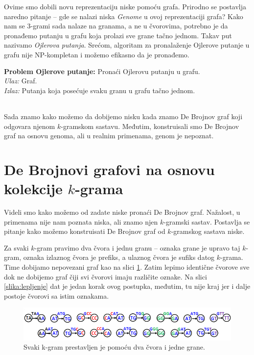 Ovime smo dobili novu reprezentaciju niske pomoću grafa. Prirodno se postavlja naredno pitanje -- gde se nalazi niska \textit{Genome} u ovoj reprezentaciji grafa? Kako nam se 3-grami sada nalaze na granama, a ne u čvorovima, potrebno je da pronađemo putanju u grafu koja prolazi sve grane tačno jednom. Takav put nazivamo \emph{Ojlerova putanja}. Srećom, algoritam za pronalaženje Ojlerove putanje u grafu nije NP-kompletan i možemo efikasno da je pronađemo.
~ \\
\begin{tcolorbox}
	\textbf{Problem Ojlerove putanje:} Pronaći Ojlerovu putanju u grafu. \\
	\textit{Ulaz:} Graf.\\
	\textit{Izlaz:} Putanja koja posećuje svaku granu u grafu tačno jednom.
\end{tcolorbox}

~\\

Sada znamo kako možemo da dobijemo nisku kada znamo De Brojnov graf koji odgovara njenom $k$-gramskom sastavu. Međutim, konstruisali smo De Brojnov graf na osnovu genoma, ali u realnim primenama, genom je nepoznat.

\section{De Brojnovi grafovi na osnovu kolekcije $k$-grama}

Videli smo kako mo\v zemo od zadate niske prona\'ci De Brojnov graf. Na\v zalost, u primenama nije nam poznata niska, ali znamo njen $k$-gramski sastav. Postavlja se pitanje kako mo\v zemo konstruisati De Brojnov graf od $k$-gramskog sastava niske. 

Za svaki $k$-gram pravimo dva čvora i jednu granu -- oznaka grane je upravo taj $k$-gram, oznaka izlaznog \v cvora je prefiks, a ulaznog \v cvora je sufiks datog $k$-grama. Time dobijamo nepovezani graf kao na slici \ref{slika:kgrami}. Zatim lepimo identične čvorove sve dok ne dobijemo graf čiji svi čvorovi imaju različite oznake. Na slici \ref{slika:lepljenje} dat je jedan korak ovog postupka, međutim, tu nije kraj jer i dalje postoje čvorovi sa istim oznakama.

\begin{figure}[h]
	\centering
	\includegraphics[width=1\textwidth]{poglavlja/3/slike/debrojnov1.png}
	\caption{Svaki k-gram prestavljen je pomoću dva čvora i jedne grane.}
	\label{slika:kgrami}
\end{figure} 

